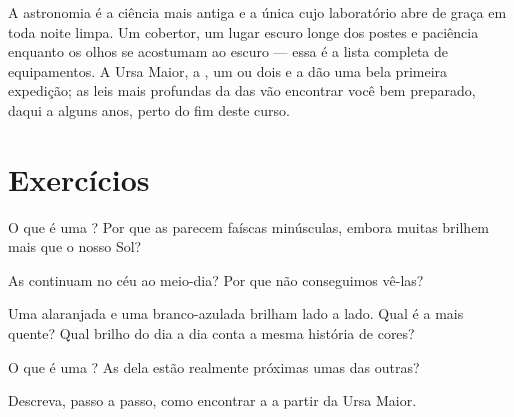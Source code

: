 \begin{remark}\label{rem:g5:stars-night-sky:lookup}
A astronomia é a ciência mais antiga e a única cujo laboratório abre
de graça em toda noite limpa. Um cobertor, um lugar escuro longe dos
postes e paciência enquanto os olhos se acostumam ao escuro --- essa
é a lista completa de equipamentos. A Ursa Maior, a , um
 ou dois e a  dão uma bela primeira expedição; as
leis mais profundas da  das  vão encontrar você bem
preparado, daqui a alguns anos, perto do fim deste curso.
\end{remark}

\section{Exercícios}

\begin{exercise}[$\star$]\label{exo:g5:stars-night-sky:1}
O que é uma ? Por que as  parecem faíscas minúsculas,
embora muitas brilhem mais que o nosso Sol?
\end{exercise}

\begin{exercise}[$\star$]\label{exo:g5:stars-night-sky:2}
As  continuam no céu ao meio-dia? Por que não conseguimos
vê-las?
\end{exercise}

\begin{exercise}[$\star$]\label{exo:g5:stars-night-sky:3}
Uma  alaranjada e uma  branco-azulada brilham lado a
lado. Qual é a mais quente? Qual brilho do dia a dia conta a mesma
história de cores?
\end{exercise}

\begin{exercise}[$\star$]\label{exo:g5:stars-night-sky:4}
O que é uma ? As  dela estão realmente próximas
umas das outras?
\end{exercise}

\begin{exercise}[$\star$]\label{exo:g5:stars-night-sky:5}
Descreva, passo a passo, como encontrar a  a partir da
Ursa Maior.
\end{exercise}

